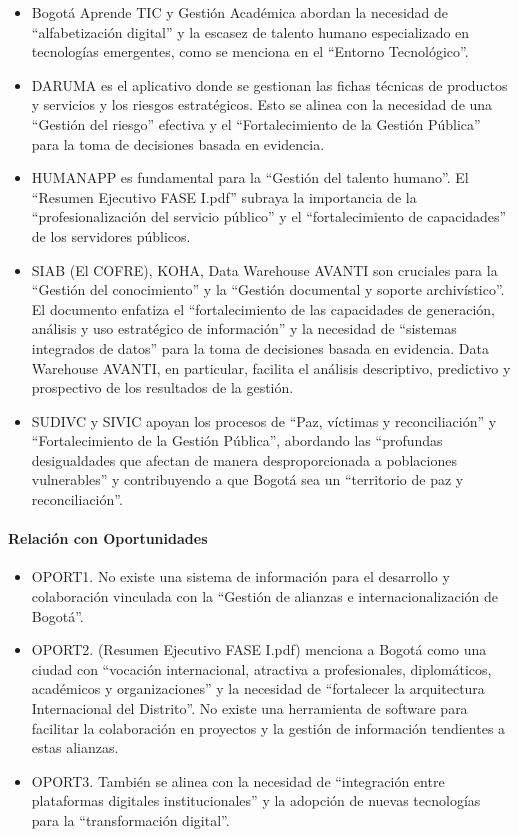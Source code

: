 \documentclass[
	a4paper, %
	12pt, %
]{include/CSSullivanBusinessReport}
\def\tightlist{}
\begin{document}
\begin{itemize}
\tightlist
\item
  Bogotá Aprende TIC y Gestión Académica abordan la necesidad de
  ``alfabetización digital'' y la escasez de talento humano
  especializado en tecnologías emergentes, como se menciona en el
  ``Entorno Tecnológico''.
\item
  DARUMA es el aplicativo donde se gestionan las fichas técnicas de
  productos y servicios y los riesgos estratégicos. Esto se alinea con
  la necesidad de una ``Gestión del riesgo'' efectiva y el
  ``Fortalecimiento de la Gestión Pública'' para la toma de decisiones
  basada en evidencia.
\item
  HUMANAPP es fundamental para la ``Gestión del talento humano''. El
  ``Resumen Ejecutivo FASE I.pdf'' subraya la importancia de la
  ``profesionalización del servicio público'' y el ``fortalecimiento de
  capacidades'' de los servidores públicos.
\item
  SIAB (El COFRE), KOHA, Data Warehouse AVANTI son cruciales para la
  ``Gestión del conocimiento'' y la ``Gestión documental y soporte
  archivístico''. El documento enfatiza el ``fortalecimiento de las
  capacidades de generación, análisis y uso estratégico de información''
  y la necesidad de ``sistemas integrados de datos'' para la toma de
  decisiones basada en evidencia. Data Warehouse AVANTI, en particular,
  facilita el análisis descriptivo, predictivo y prospectivo de los
  resultados de la gestión.
\item
  SUDIVC y SIVIC apoyan los procesos de ``Paz, víctimas y
  reconciliación'' y ``Fortalecimiento de la Gestión Pública'',
  abordando las ``profundas desigualdades que afectan de manera
  desproporcionada a poblaciones vulnerables'' y contribuyendo a que
  Bogotá sea un ``territorio de paz y reconciliación''.
\end{itemize}

\paragraph{Relación con
Oportunidades}\label{sec:relaciuxf3n-con-oportunidades}

\begin{itemize}
\tightlist
\item
  OPORT1. No existe una sistema de información para el desarrollo y
  colaboración vinculada con la ``Gestión de alianzas e
  internacionalización de Bogotá''.
\item
  OPORT2. (Resumen Ejecutivo FASE I.pdf) menciona a Bogotá como una
  ciudad con ``vocación internacional, atractiva a profesionales,
  diplomáticos, académicos y organizaciones'' y la necesidad de
  ``fortalecer la arquitectura Internacional del Distrito''. No existe
  una herramienta de software para facilitar la colaboración en
  proyectos y la gestión de información tendientes a estas alianzas.
\item
  OPORT3. También se alinea con la necesidad de ``integración entre
  plataformas digitales institucionales'' y la adopción de nuevas
  tecnologías para la ``transformación digital''.
\end{itemize}
\end{document}
